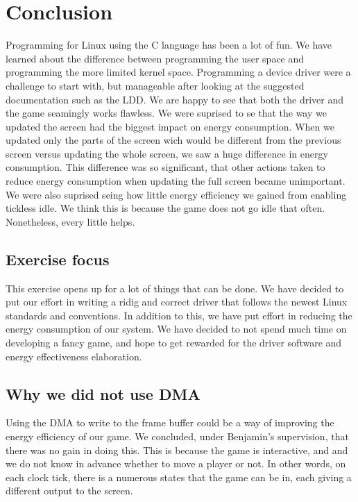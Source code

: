 \section{Conclusion}
Programming for Linux using the C language has been a lot of fun. We have learned about the difference between programming the user space and programming the more limited kernel space. Programming a device driver were a challenge to start with, but manageable after looking at the suggested documentation such as the LDD. We are happy to see that both the driver and the game seamingly works flawless. 
We were suprised to se that the way we updated the screen had the biggest impact on energy consumption. When we updated only the parts of the screen wich would be different from the previous screen versus updating the whole screen, we saw a huge difference in energy consumption. This difference was so significant, that other actions taken to reduce energy consumption when updating the full screen became unimportant. We were also suprised seing how little energy efficiency we gained from enabling tickless idle. We think this is because the game does not go idle that often. Nonetheless, every little helps.

\subsection{Exercise focus}
This exercise opens up for a lot of things that can be done. We have decided to put our effort in writing a ridig and correct driver that follows the newest Linux standards and conventions. In addition to this, we have put effort in reducing the energy consumption of our system. We have decided to not spend much time on developing a fancy game, and hope to get rewarded for the driver software and energy effectiveness elaboration. 

\subsection{Why we did not use DMA}
Using the DMA to write to the frame buffer could be a way of improving the energy efficiency of our game. We concluded, under Benjamin's supervision, that there was no gain in doing this. This is because the game is interactive, and and we do not know in advance whether to move a player or not. In other words, on each clock tick, there is a numerous states that the game can be in, each giving a different output to the screen.

